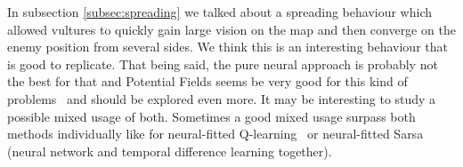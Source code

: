 In subsection \ref{subsec:spreading} we talked about a spreading behaviour which
allowed vultures to quickly gain large vision on the map and then converge on the enemy
position from several sides. We think this is an interesting behaviour that is good
to replicate. That being said, the pure neural approach is probably not the best for that and
Potential Fields seems be very good for this kind of problems~\cite{Hagelback08RTSPotentialFields, Svendsen12SCPotentialFieldsGP}
and should be explored even more. It may be interesting to study a possible mixed usage of both.
Sometimes a good mixed usage surpass both methods individually like for neural-fitted
Q-learning~\cite{Riedmiller05NeuralFittedQ} or neural-fitted Sarsa~\cite{Shantia11ConnectionistSC}
(neural network and temporal difference learning together).
